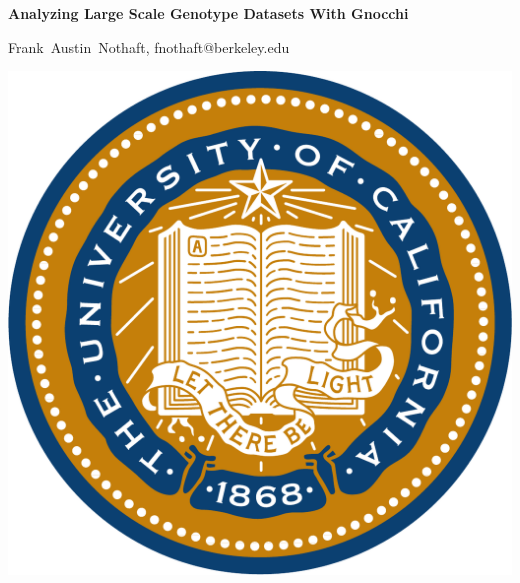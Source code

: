 \documentclass[11pt]{a0poster}
\date{}
\begin{document}
\begin{minipage}{0.887\linewidth}
\vspace{130pt}
\hspace{92pt}
\color{Blue}
{\fontsize{3cm}{1em} \textbf{Analyzing Large Scale Genotype Datasets With Gnocchi}}

\hspace{92pt}
\huge Frank~Austin~Nothaft, fnothaft@berkeley.edu

\vspace{130pt}
\end{minipage}
\begin{minipage}{0.113\linewidth}
\includegraphics[scale=0.6]{ucseal_540_139.pdf}
\end{minipage}

{\color{Blue}\noindent\makebox[\linewidth]{\rule{\paperwidth}{30pt}}}
\end{document}
